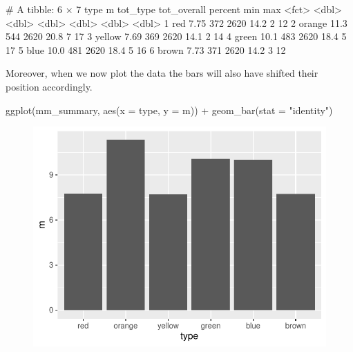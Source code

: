 
\begin{outR}
# A tibble: 6 × 7
  type       m tot_type tot_overall percent   min   max
  <fct>  <dbl>    <dbl>       <dbl>   <dbl> <dbl> <dbl>
1 red     7.75      372        2620    14.2     2    12
2 orange 11.3       544        2620    20.8     7    17
3 yellow  7.69      369        2620    14.1     2    14
4 green  10.1       483        2620    18.4     5    17
5 blue   10.0       481        2620    18.4     5    16
6 brown   7.73      371        2620    14.2     3    12
\end{outR}

\noindent

Moreover, when we now plot the data the bars will also have shifted their position accordingly.

\begin{inR}
ggplot(mm_summary, aes(x = type, y = m)) +
  geom_bar(stat = "identity")
\end{inR}

\vspace{2em}

\begin{figure}[H]
\includegraphics[scale = .75]{graphics/ch3Figs/bar_5.pdf}
\end{figure}

